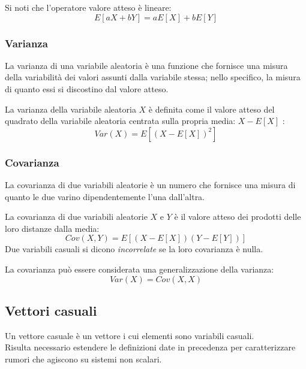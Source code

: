\noindent  Si noti che l'operatore valore atteso è lineare:
\begin{equation}
E[aX + bY] = aE[X] + bE[Y]
\end{equation}


\subsubsection{Varianza}

La varianza di una variabile aleatoria è una funzione che fornisce una misura della variabilità dei valori assunti dalla variabile stessa; nello specifico, la misura di quanto essi si discostino dal valore atteso.

La varianza della variabile aleatoria $X$ è definita come il valore atteso del quadrato della variabile aleatoria centrata sulla propria media: $X - E[X]$ :
\begin{equation}
Var(X) = E[(X - E[X])^2]
\end{equation}

\subsubsection{Covarianza}

La covarianza di due variabili aleatorie è un numero che fornisce una misura di quanto le due varino dipendentemente l'una dall'altra.

La covarianza di due variabili aleatorie $X$ e $Y$ è il valore atteso dei prodotti delle loro distanze dalla media: \begin{equation}
Cov(X,Y)= E [(X-E[X])(Y-E[Y])]
\end{equation}
Due variabili casuali si dicono \textit{incorrelate} se la loro covarianza è nulla.

La covarianza può essere considerata una generalizzazione della varianza:
\begin{equation}
Var(X) = Cov(X,X)
\end{equation}

\subsection{Vettori casuali}

Un vettore casuale è un vettore i cui elementi sono variabili casuali.\\
Risulta necessario estendere le definizioni date in precedenza per caratterizzare rumori che agiscono su sistemi non scalari.


